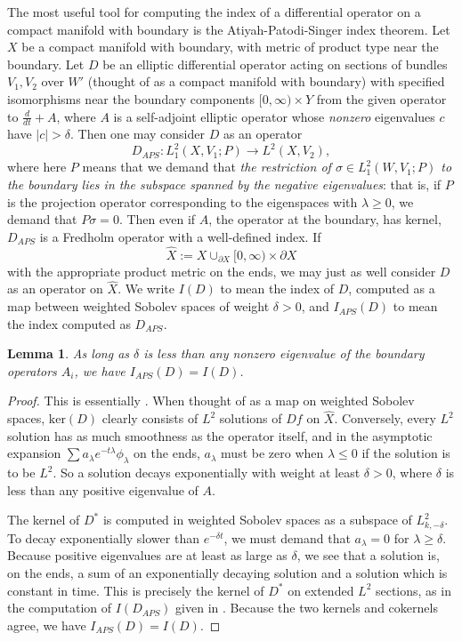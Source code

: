 \documentclass[10pt,a4paper]{amsart}
\newtheorem{lemma}[theorem]{Lemma}
\theoremstyle{definition}
\theoremstyle{remark}
\numberwithin{figure}{qchap}
\begin{document}
The most useful tool for computing the index of a differential operator on a compact manifold with boundary is the Atiyah-Patodi-Singer index theorem. Let $X$ be a compact manifold with boundary, with metric of product type near the boundary. Let $D$ be an elliptic differential operator acting on sections of bundles $V_1, V_2$ over $W'$ (thought of as a compact manifold with boundary) with specified isomorphisms near the boundary components $[0,\infty) \times Y$ from the given operator to $\frac{d}{dt} + A$, where $A$ is a self-adjoint elliptic operator whose \textit{nonzero} eigenvalues $c$ have $|c| > \delta$. Then one may consider $D$ as an operator 
$$D_{APS}: L^2_1(X,V_1;P) \to L^2(X,V_2),$$ 
where here $P$ means that we demand that \emph{the restriction of $\sigma \in L^2_1(W,V_1;P)$ to the boundary lies in the subspace spanned by the negative eigenvalues}: that is, if $P$ is the projection operator corresponding to the eigenspaces with $\lambda \geq 0$, we demand that $P\sigma = 0$. Then even if $A$, the operator at the boundary, has kernel, $D_{APS}$ is a Fredholm operator with a well-defined index. If 
$$\hat X := X \cup_{\partial X} [0,\infty) \times \partial X$$ 
with the appropriate product metric on the ends, we may just as well consider $D$ as an operator on $\hat X$. We write $I(D)$ to mean the index of $D$, computed as a map between weighted Sobolev spaces of weight $\delta > 0$, and $I_{APS}(D)$ to mean the index computed as $D_{APS}$.

\begin{lemma}As long as $\delta$ is less than any nonzero eigenvalue of the boundary operators $A_i$, we have $I_{APS}(D) = I(D)$.
\end{lemma}

\begin{proof}This is essentially \cite[Proposition~3.11]{atiyah1975spectral}. When thought of as a map on weighted Sobolev spaces, $\text{ker}(D)$ clearly consists of $L^2$ solutions of $Df$ on $\hat X$. Conversely, every $L^2$ solution has as much smoothness as the operator itself, and in the asymptotic expansion $\sum a_\lambda e^{-t\lambda} \phi_\lambda$ on the ends, $a_\lambda$ must be zero when $\lambda \leq 0$ if the solution is to be $L^2$. So a solution decays exponentially with weight at least $\delta > 0$, where $\delta$ is less than any positive eigenvalue of $A$.

The kernel of $D^*$ is computed in weighted Sobolev spaces as a subspace of $L^2_{k,-\delta}$. To decay exponentially slower than $e^{-\delta t}$, we must demand that $a_\lambda = 0$ for $\lambda \geq \delta$. Because positive eigenvalues are at least as large as $\delta$, we see that a solution is, on the ends, a sum of an exponentially decaying solution and a solution which is constant in time. This is precisely the kernel of $D^*$ on extended $L^2$ sections, as in the computation of $I(D_{APS})$ given in  \cite[Proposition~3.11]{atiyah1975spectral}. Because the two kernels and cokernels agree, we have $I_{APS}(D) = I(D)$.
\end{proof}
\end{document}
